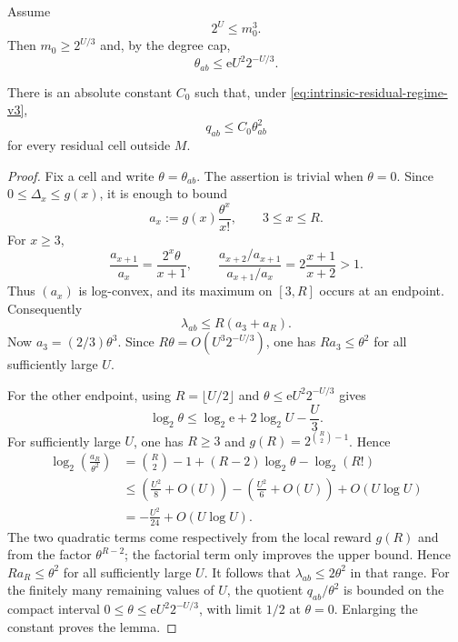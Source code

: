 Assume
\begin{equation}
  2^U\le m_0^3.
  \label{eq:intrinsic-residual-regime-v3}
\end{equation}
Then $m_0\ge2^{U/3}$ and, by the degree cap,
\[
  \theta_{ab}
  \le
  \mathrm e U^2 2^{-U/3}.
\]

\begin{lemma}
\label{lem:q-quadratic-v3}
There is an absolute constant $C_0$ such that, under
\eqref{eq:intrinsic-residual-regime-v3},
\begin{equation}
  q_{ab}\le C_0\theta_{ab}^2
  \label{eq:q-quadratic-v3}
\end{equation}
for every residual cell outside $M$.
\end{lemma}

\begin{proof}
Fix a cell and write $\theta=\theta_{ab}$. The assertion is trivial when
$\theta=0$. Since $0\le\Delta_x\le g(x)$, it is enough to bound
\[
  a_x:=g(x)\frac{\theta^x}{x!},
  \qquad 3\le x\le R.
\]
For $x\ge3$,
\[
  \frac{a_{x+1}}{a_x}
  =
  \frac{2^x\theta}{x+1},
  \qquad
  \frac{a_{x+2}/a_{x+1}}{a_{x+1}/a_x}
  =
  2\frac{x+1}{x+2}>1.
\]
Thus $(a_x)$ is log-convex, and its maximum on $[3,R]$ occurs at an endpoint.
Consequently
\[
  \lambda_{ab}
  \le
  R(a_3+a_R).
\]
Now $a_3=(2/3)\theta^3$. Since
$R\theta=O(U^3 2^{-U/3})$, one has $Ra_3\le\theta^2$ for all sufficiently
large $U$.

For the other endpoint, using
$R=\lfloor U/2\rfloor$ and
$\theta\le\mathrm e U^2 2^{-U/3}$ gives
\[
  \log_2\theta
  \le
  \log_2\mathrm e+2\log_2U-\frac U3.
\]
For sufficiently large $U$, one has $R\ge3$ and $g(R)=2^{\binom R2-1}$. Hence
\[
\begin{aligned}
  \log_2\!\left(\frac{a_R}{\theta^2}\right)
  &=
  \binom R2-1+(R-2)\log_2\theta-\log_2(R!)\\
  &\le
  \left(\frac{U^2}{8}+O(U)\right)
  -\left(\frac{U^2}{6}+O(U)\right)
  +O(U\log U)\\
  &=
  -\frac{U^2}{24}+O(U\log U).
\end{aligned}
\]
The two quadratic terms come respectively from the local reward $g(R)$ and
from the factor $\theta^{R-2}$; the factorial term only improves the upper
bound. Hence $Ra_R\le\theta^2$ for all sufficiently large $U$. It follows that
$\lambda_{ab}\le2\theta^2$ in that range. For the finitely many remaining
values of $U$, the quotient $q_{ab}/\theta^2$ is bounded on the compact interval
$0\le\theta\le\mathrm e U^2 2^{-U/3}$, with limit $1/2$ at $\theta=0$.
Enlarging the constant proves the lemma.
\end{proof}

